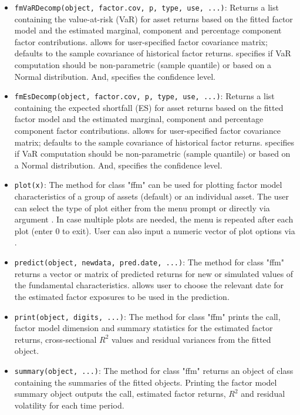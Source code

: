 \documentclass[a4paper]{article}\usepackage[]{graphicx}\usepackage[]{color}
\begin{document}
\begin{itemize}
\item \verb"fmVaRDecomp(object, factor.cov, p, type, use, ...)": Returns a list containing the value-at-risk (VaR) for asset returns based on the fitted factor model and the estimated marginal, component and percentage component factor contributions.  allows for user-specified factor covariance matrix; defaults to the sample covariance of historical factor returns.  specifies if VaR computation should be non-parametric (sample quantile) or based on a Normal distribution. And,  specifies the confidence level.

\item \verb"fmEsDecomp(object, factor.cov, p, type, use, ...)": Returns a list containing the expected shortfall (ES) for asset returns based on the fitted factor model and the estimated marginal, component and percentage component factor contributions.  allows for user-specified factor covariance matrix; defaults to the sample covariance of historical factor returns.  specifies if VaR computation should be non-parametric (sample quantile) or based on a Normal distribution. And,  specifies the confidence level.

\item \verb"plot(x)": The  method for class "ffm" can be used for plotting factor model characteristics of a group of assets (default) or an individual asset. The user can select the type of plot either from the menu prompt or directly via argument . In case multiple plots are needed, the menu is repeated after each plot (enter 0 to exit). User can also input a numeric vector of plot options via .

\item \verb"predict(object, newdata, pred.date, ...)": The  method for class "ffm" returns a vector or matrix of predicted returns for new or simulated values of the fundamental characteristics.  allows user to choose the relevant date for the estimated factor exposures to be used in the prediction.

\item \verb"print(object, digits, ...)": The  method for class "ffm" prints the call, factor model dimension and summary statistics for the estimated factor returns, cross-sectional $R^2$ values and residual variances from the fitted object.

\item \verb"summary(object, ...)": The  method for class "ffm" returns an object of class  containing the summaries of the fitted objects. Printing the factor model summary object outputs the call, estimated factor returns, $R^2$ and residual volatility for each time period.

\end{itemize}
\end{document}
